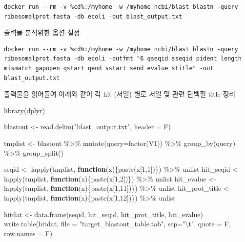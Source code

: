 \documentclass[
]{book}
\newenvironment{Shaded}{\begin{snugshade}}{\end{snugshade}}
\newcommand{\AttributeTok}[1]{\textcolor[rgb]{0.77,0.63,0.00}{#1}}
\newcommand{\ControlFlowTok}[1]{\textcolor[rgb]{0.13,0.29,0.53}{\textbf{#1}}}
\newcommand{\DecValTok}[1]{\textcolor[rgb]{0.00,0.00,0.81}{#1}}
\newcommand{\FunctionTok}[1]{\textcolor[rgb]{0.00,0.00,0.00}{#1}}
\newcommand{\NormalTok}[1]{#1}
\newcommand{\OtherTok}[1]{\textcolor[rgb]{0.56,0.35,0.01}{#1}}
\newcommand{\SpecialCharTok}[1]{\textcolor[rgb]{0.00,0.00,0.00}{#1}}
\newcommand{\StringTok}[1]{\textcolor[rgb]{0.31,0.60,0.02}{#1}}
\begin{document}
\begin{verbatim}
docker run --rm -v %cd%:/myhome -w /myhome ncbi/blast blastn -query ribosomalprot.fasta -db ecoli -out blast_output.txt
\end{verbatim}

출력물 분석위한 옵션 설정

\begin{verbatim}
docker run --rm -v %cd%:/myhome -w /myhome ncbi/blast blastn -query ribosomalprot.fasta -db ecoli -outfmt "6 qseqid sseqid pident length mismatch gapopen qstart qend sstart send evalue stitle" -out blast_output.txt
\end{verbatim}

출력물을 읽어들여 아래와 같이 각 hit (서열) 별로 서열 및 관련 단백질 title 정리

\begin{Shaded}
\begin{Highlighting}[]
\FunctionTok{library}\NormalTok{(dplyr)}

\NormalTok{blastout }\OtherTok{\textless{}{-}} \FunctionTok{read.delim}\NormalTok{(}\StringTok{"blast\_output.txt"}\NormalTok{, }\AttributeTok{header =}\NormalTok{ F)}

\NormalTok{tmplist }\OtherTok{\textless{}{-}}\NormalTok{ blastout }\SpecialCharTok{\%\textgreater{}\%} 
  \FunctionTok{mutate}\NormalTok{(}\AttributeTok{query=}\FunctionTok{factor}\NormalTok{(V1)) }\SpecialCharTok{\%\textgreater{}\%} 
  \FunctionTok{group\_by}\NormalTok{(query) }\SpecialCharTok{\%\textgreater{}\%} 
  \FunctionTok{group\_split}\NormalTok{()}

\NormalTok{seqid }\OtherTok{\textless{}{-}} \FunctionTok{lapply}\NormalTok{(tmplist, }\ControlFlowTok{function}\NormalTok{(x)\{}\FunctionTok{paste}\NormalTok{(x[}\DecValTok{1}\NormalTok{,}\DecValTok{1}\NormalTok{])\}) }\SpecialCharTok{\%\textgreater{}\%}\NormalTok{ unlist}
\NormalTok{hit\_seqid }\OtherTok{\textless{}{-}} \FunctionTok{lapply}\NormalTok{(tmplist, }\ControlFlowTok{function}\NormalTok{(x)\{}\FunctionTok{paste}\NormalTok{(x[}\DecValTok{1}\NormalTok{,}\DecValTok{2}\NormalTok{])\}) }\SpecialCharTok{\%\textgreater{}\%}\NormalTok{ unlist}
\NormalTok{hit\_evalue }\OtherTok{\textless{}{-}} \FunctionTok{lapply}\NormalTok{(tmplist, }\ControlFlowTok{function}\NormalTok{(x)\{}\FunctionTok{paste}\NormalTok{(x[}\DecValTok{1}\NormalTok{,}\DecValTok{11}\NormalTok{])\}) }\SpecialCharTok{\%\textgreater{}\%}\NormalTok{ unlist}
\NormalTok{hit\_prot\_title }\OtherTok{\textless{}{-}} \FunctionTok{lapply}\NormalTok{(tmplist, }\ControlFlowTok{function}\NormalTok{(x)\{}\FunctionTok{paste}\NormalTok{(x[}\DecValTok{1}\NormalTok{,}\DecValTok{12}\NormalTok{])\}) }\SpecialCharTok{\%\textgreater{}\%}\NormalTok{ unlist}

\NormalTok{hitdat }\OtherTok{\textless{}{-}} \FunctionTok{data.frame}\NormalTok{(seqid, hit\_seqid, hit\_prot\_title, hit\_evalue)}
\FunctionTok{write.table}\NormalTok{(hitdat, }\AttributeTok{file =} \StringTok{"target\_blastout\_table.tab"}\NormalTok{, }\AttributeTok{sep=}\StringTok{"}\SpecialCharTok{\textbackslash{}t}\StringTok{"}\NormalTok{, }\AttributeTok{quote =}\NormalTok{ F, }\AttributeTok{row.names =}\NormalTok{ F)}
\end{Highlighting}
\end{Shaded}
\end{document}
